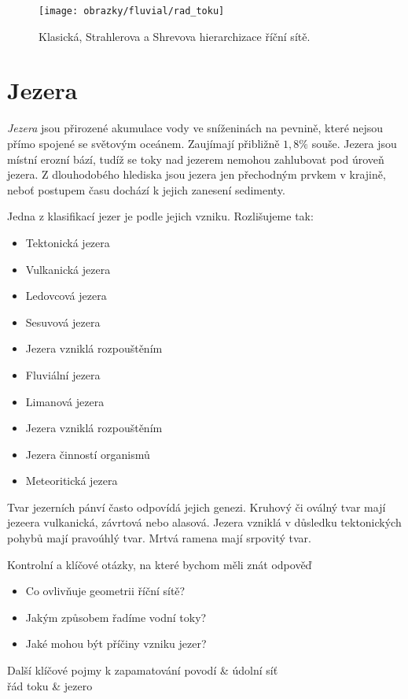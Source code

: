 \begin{figure}
	\centering
	\texttt{[image: obrazky/fluvial/rad\_toku]}
	\caption{Klasická, Strahlerova a Shrevova hierarchizace říční sítě.}
	\label{fig:radtoku}
\end{figure}


\section{Jezera}
\emph{Jezera} jsou přirozené akumulace vody ve sníženinách na pevnině, které nejsou přímo spojené se světovým oceánem. Zaujímají přibližně $1,8 \%$ souše. Jezera jsou místní erozní bází, tudíž se toky nad jezerem nemohou zahlubovat pod úroveň jezera. Z dlouhodobého hlediska jsou jezera jen přechodným prvkem v krajině, neboť postupem času dochází k jejich zanesení sedimenty. 

Jedna z klasifikací jezer je podle jejich vzniku. Rozlišujeme tak:
\begin{itemize}
	\item Tektonická jezera	
	\item Vulkanická jezera
	\item Ledovcová jezera
	\item Sesuvová jezera
	\item Jezera vzniklá rozpouštěním
	\item Fluviální jezera
	\item Limanová jezera
	\item Jezera vzniklá rozpouštěním
	\item Jezera činností organismů
	\item Meteoritická jezera
\end{itemize}

Tvar jezerních pánví často odpovídá jejich genezi. Kruhový či oválný tvar mají jezeera vulkanická, závrtová nebo alasová. Jezera vzniklá v důsledku tektonických pohybů mají pravoúhlý tvar. Mrtvá ramena mají srpovitý tvar.






\newpage
\onecolumn
\begin{boxotazky}{Kontrolní a klíčové otázky, na které bychom měli znát odpověď}
	\begin{itemize}
		\item Co ovlivňuje geometrii říční sítě? 
		\item Jakým způsobem řadíme vodní toky?
		\item Jaké mohou být příčiny vzniku jezer?		
	\end{itemize}
\end{boxotazky}

\begin{boxslovnik}{Další klíčové pojmy k zapamatování}
	povodí & údolní síť \\
	řád toku & jezero \\
	
\end{boxslovnik}
\twocolumn

